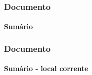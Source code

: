 \begin{frame}[fragile]
\frametitle{Documento}
\framesubtitle{Sumário}
\begin{LTXexample}
\tableofcontents
\end{LTXexample}
\end{frame}


\begin{frame}[fragile]
\frametitle{Documento}
\framesubtitle{Sumário - local corrente}
\begin{LTXexample}
\end{LTXexample}
\end{frame}


%

%

%

%
